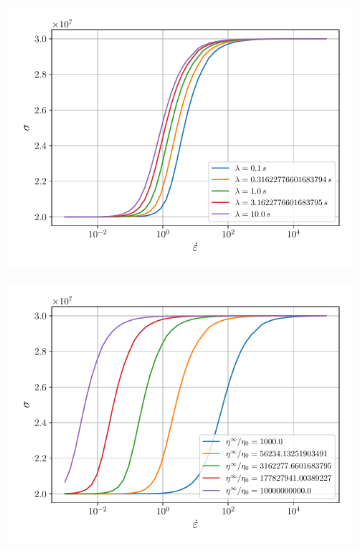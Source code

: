 \documentclass[12pt]{article}
\begin{document}
\begin{figure}[!htb]
	\centering
	\begin{subfigure}{0.48\textwidth}
		\centering
		\includegraphics[width=\linewidth]{carreau-lams}
	\end{subfigure}
	\begin{subfigure}{0.48\textwidth}
		\centering
		\includegraphics[width=\linewidth]{carreau-etas}
	\end{subfigure}
	

\end{figure}
\end{document}
